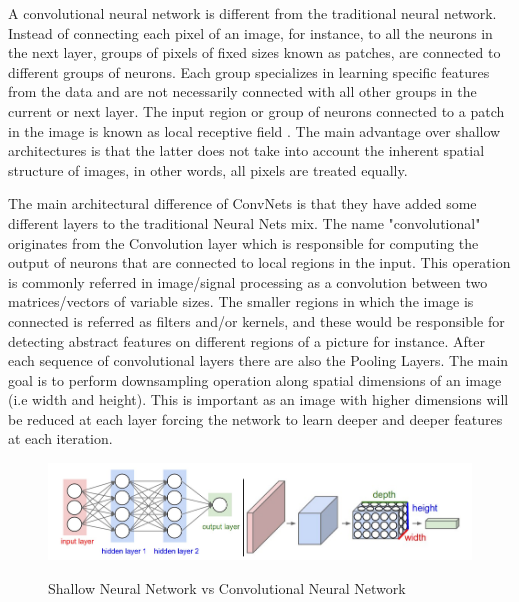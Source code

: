 A convolutional neural network is different from the traditional neural network. Instead of connecting each pixel of an image, for instance, to all the neurons in the next layer, groups of pixels of fixed sizes known as patches, are connected to different groups of neurons. Each group specializes in learning specific features from the data and are not necessarily connected with all other groups in the current or next layer. The input region or group of neurons connected to a patch in the image is known as local receptive field \cite{nielsen2016}. The main advantage over shallow architectures is that the latter does not take into account the inherent spatial structure of images, in other words, all pixels are treated equally.

The main architectural difference of ConvNets is that they have added some different layers to the traditional Neural Nets mix. The name "convolutional" originates from the Convolution layer which is responsible for computing the output of neurons that are connected to local regions in the input. This operation is commonly referred in image/signal processing as a convolution between two matrices/vectors of variable sizes. The smaller regions in which the image is connected is referred as filters and/or kernels, and these would be responsible for detecting abstract features on different regions of a picture for instance. After each sequence of convolutional layers there are also the Pooling Layers. The main goal is to perform downsampling operation along spatial dimensions of an image (i.e width and height). This is important as an image with higher dimensions will be reduced at each layer forcing the network to learn deeper and deeper features at each iteration.

\begin{figure}[!h]
\centering
	\includegraphics[scale=0.6]{conv.png}
\caption{Shallow Neural Network vs Convolutional Neural Network}
\cite{stanford2016}
\label{fig:conv}
\end{figure}

